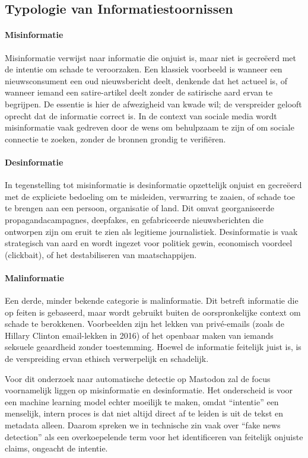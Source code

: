\subsection{Typologie van Informatiestoornissen}

\paragraph{Misinformatie}
Misinformatie verwijst naar informatie die onjuist is, maar niet is gecreëerd met de intentie om schade te veroorzaken. Een klassiek voorbeeld is wanneer een nieuwsconsument een oud nieuwsbericht deelt, denkende dat het actueel is, of wanneer iemand een satire-artikel deelt zonder de satirische aard ervan te begrijpen. De essentie is hier de afwezigheid van kwade wil; de verspreider gelooft oprecht dat de informatie correct is. In de context van sociale media wordt misinformatie vaak gedreven door de wens om behulpzaam te zijn of om sociale connectie te zoeken, zonder de bronnen grondig te verifiëren.

\paragraph{Desinformatie}
In tegenstelling tot misinformatie is desinformatie opzettelijk onjuist en gecreëerd met de expliciete bedoeling om te misleiden, verwarring te zaaien, of schade toe te brengen aan een persoon, organisatie of land. Dit omvat georganiseerde propagandacampagnes, deepfakes, en gefabriceerde nieuwsberichten die ontworpen zijn om eruit te zien als legitieme journalistiek. Desinformatie is vaak strategisch van aard en wordt ingezet voor politiek gewin, economisch voordeel (clickbait), of het destabiliseren van maatschappijen.

\paragraph{Malinformatie}
Een derde, minder bekende categorie is malinformatie. Dit betreft informatie die op feiten is gebaseerd, maar wordt gebruikt buiten de oorspronkelijke context om schade te berokkenen. Voorbeelden zijn het lekken van privé-emails (zoals de Hillary Clinton email-lekken in 2016) of het openbaar maken van iemands seksuele geaardheid zonder toestemming. Hoewel de informatie feitelijk juist is, is de verspreiding ervan ethisch verwerpelijk en schadelijk.

Voor dit onderzoek naar automatische detectie op Mastodon zal de focus voornamelijk liggen op misinformatie en desinformatie. Het onderscheid is voor een machine learning model echter moeilijk te maken, omdat ``intentie'' een menselijk, intern proces is dat niet altijd direct af te leiden is uit de tekst en metadata alleen. Daarom spreken we in technische zin vaak over ``fake news detection'' als een overkoepelende term voor het identificeren van feitelijk onjuiste claims, ongeacht de intentie.

